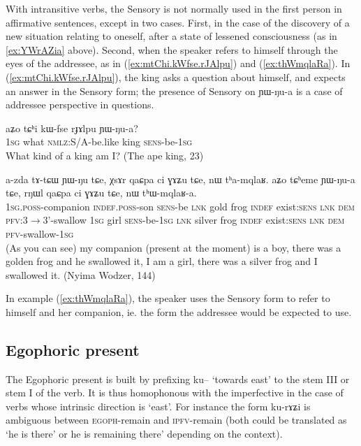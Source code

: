 \documentclass[oldfontcommands,oneside,a4paper,11pt]{article}
\newcommand{\ipa}[1]{{\phon \mbox{#1}}} %
\newcommand{\refb}[1]{(\ref{#1})}
\begin{document}
 With intransitive verbs, the Sensory is not normally used in the first person in affirmative sentences, except in two cases. First, in the case of the discovery of a new situation relating to oneself, after a state of lessened consciousness (as in \ref{ex:YWrAZia} above). Second, when the speaker refers to himself through the eyes of the addressee, as in \refb{ex:mtChi.kWfse.rJAlpu} and \refb{ex:thWmqlaRa}. In \refb{ex:mtChi.kWfse.rJAlpu}, the king asks a question about himself, and expects an answer in the Sensory form; the presence of Sensory on \ipa{ɲɯ-ŋu-a} is a case of addressee perspective in questions.


\begin{exe}
\ex \label{ex:mtChi.kWfse.rJAlpu}
\gll
\ipa{aʑo}  	\ipa{tɕʰi}  	\ipa{kɯ-fse}  	\ipa{rɟɤlpu}  	\ipa{ɲɯ-ŋu-a?}  \\
\textsc{1sg} what \textsc{nmlz}:S/A-be.like king \textsc{sens}-be-\textsc{1sg} \\
\glt What kind of a king am I? (The ape  king, 23)
\end{exe}


\begin{exe}
\ex \label{ex:thWmqlaRa}
\gll
\ipa{a-zda}  	\ipa{tɤ-tɕɯ}  	\ipa{ɲɯ-ŋu}  	\ipa{tɕe,}  	\ipa{χsɤr}  	\ipa{qaɕpa}  	\ipa{ci}  	\ipa{ɣɤʑu}  	\ipa{tɕe,}  	\ipa{nɯ}  	\ipa{tʰa-mqlaʁ.} \ipa{aʑo}  	\ipa{tɕʰeme}  	\ipa{ɲɯ-ŋu-a}  	\ipa{tɕe,}  	\ipa{rŋɯl}  	\ipa{qaɕpa}  	\ipa{ci}  	\ipa{ɣɤʑu}  	\ipa{tɕe,}  	\ipa{nɯ}  	\ipa{tʰɯ-mqlaʁ-a.}  \\
\textsc{1sg.poss}-companion \textsc{indef.poss}-son \textsc{sens}-be  \textsc{lnk} gold frog \textsc{indef} exist:\textsc{sens} \textsc{lnk} \textsc{dem} \textsc{pfv}:3$\rightarrow$3'-swallow \textsc{1sg} girl \textsc{sens}-be-\textsc{1sg}  \textsc{lnk} silver frog \textsc{indef} exist:\textsc{sens} \textsc{lnk} \textsc{dem} \textsc{pfv}-swallow-\textsc{1sg} \\
\glt (As you can see) my companion (present at the moment) is a boy, there was a golden frog and he swallowed it, I am a girl, there was a silver frog and I swallowed it. (Nyima Wodzer, 144)
\end{exe}

In example \refb{ex:thWmqlaRa}, the speaker uses the Sensory form to refer to himself and her companion, ie. the form the addressee would be expected to use. 


\subsection{Egophoric present } \label{sec:egoph}
The Egophoric present  is built by prefixing \ipa{ku--} `towards east' to the stem III or stem I of the verb. It is thus homophonous with the imperfective in the case of verbs whose intrinsic direction is `east'.  For instance the form \ipa{ku-rɤʑi} is ambiguous between \textsc{egoph}-remain and \textsc{ipfv}-remain (both could be translated as `he is there' or he is remaining there' depending on the context).
\end{document}
